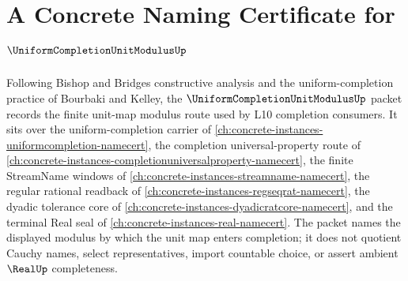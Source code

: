 \chapter{A Concrete Naming Certificate for $\UniformCompletionUnitModulusUp$}
\label{ch:concrete-instances-uniform-completion-unit-modulus-namecert}

Following Bishop and Bridges constructive analysis and the uniform-completion
practice of Bourbaki and Kelley, the $\UniformCompletionUnitModulusUp$ packet
records the finite unit-map modulus route used by L10 completion consumers. It
sits over the uniform-completion carrier of
\autoref{ch:concrete-instances-uniformcompletion-namecert}, the completion
universal-property route of
\autoref{ch:concrete-instances-completionuniversalproperty-namecert}, the
finite StreamName windows of
\autoref{ch:concrete-instances-streamname-namecert}, the regular rational
readback of \autoref{ch:concrete-instances-regseqrat-namecert}, the dyadic
tolerance core of \autoref{ch:concrete-instances-dyadicratcore-namecert}, and
the terminal Real seal of \autoref{ch:concrete-instances-real-namecert}. The
packet names the displayed modulus by which the unit map enters completion; it
does not quotient Cauchy names, select representatives, import countable
choice, or assert ambient $\RealUp$ completeness.

